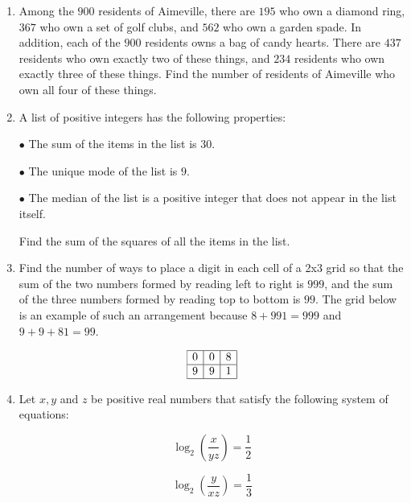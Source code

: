 \documentclass{article}
\begin{document}
\begin{enumerate}[label=\arabic*., itemsep=0.5em]\item Among the \(900\) residents of Aimeville, there are \(195\) who own a diamond ring, \(367\) who own a set of golf clubs, and \(562\) who own a garden spade. In addition, each of the \(900\) residents owns a bag of candy hearts. There are \(437\) residents who own exactly two of these things, and \(234\) residents who own exactly three of these things. Find the number of residents of Aimeville who own all four of these things.\par \vspace{0.5em}\item A list of positive integers has the following properties:

\(\bullet\) The sum of the items in the list is \(30\).

\(\bullet\) The unique mode of the list is \(9\).

\(\bullet\) The median of the list is a positive integer that does not appear in the list itself.

Find the sum of the squares of all the items in the list.\par \vspace{0.5em}\item Find the number of ways to place a digit in each cell of a 2x3 grid so that the sum of the two numbers formed by reading left to right is \(999\), and the sum of the three numbers formed by reading top to bottom is \(99\). The grid below is an example of such an arrangement because \(8+991=999\) and \(9+9+81=99\).


\begin{equation*}
\begin{array}{|c|c|c|} \hline
0 & 0 & 8 \\ \hline
9 & 9 & 1 \\ \hline
\end{array}
\end{equation*}
\par \vspace{0.5em}\item Let \(x,y\) and \(z\) be positive real numbers that satisfy the following system of equations:

\begin{equation*}
\log_2\left(\frac{x }{ yz}\right) = \frac{1 }{ 2}
\end{equation*}

\begin{equation*}
\log_2\left(\frac{y }{ xz}\right) = \frac{1 }{ 3}
\end{equation*}


\end{enumerate}
\end{document}
